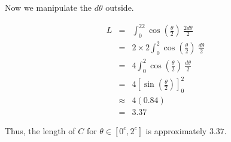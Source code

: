 Now we manipulate the $d\theta$ outside.

\begin{eqnarray*}
	L&=&\int_0^22\cos\left(\frac{\theta}{2}\right)~\frac{2d\theta}{2}\\
	&=&2\times2\int_0^2\cos\left(\frac{\theta}{2}\right)~\frac{d\theta}{2}\\
	&=&4\int_0^2\cos\left(\frac{\theta}{2}\right)~\frac{d\theta}{2}\\
	&=&4\left[\sin\left(\frac{\theta}{2}\right)\right]_0^2\\
	&\approx&4\left(0.84\right)\\
	&=&3.37
\end{eqnarray*}

Thus, the length of $C$ for $\theta\in\left[0^c,2^c\right]$ is approximately $3.37$.
